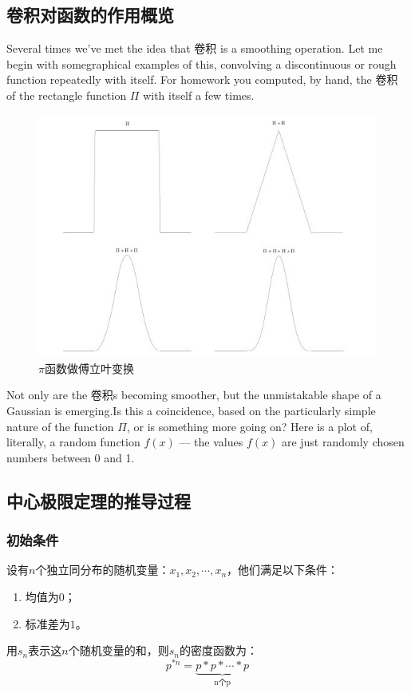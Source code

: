 \subsection{卷积对函数的作用概览}
Several times we've met the idea that 卷积 is a smoothing
operation. Let me begin with somegraphical examples of this,
convolving a discontinuous or rough function repeatedly with itself.
For homework you computed, by hand, the 卷积 of the rectangle
function $\Pi$ with itself a few times.
\begin{figure}[H]
	\centering
	\includegraphics[scale=0.4]{assets/PI.jpg}
	\caption{$\pi$函数做傅立叶变换}
\end{figure}
Not only are the 卷积s becoming smoother, but the
unmistakable shape of a Gaussian is emerging.Is this a coincidence,
based on the particularly simple nature of the function $\Pi$, or
is something more going on? Here is a plot of, literally, a random
function $f(x)$ --- the values $f(x)$ are just randomly chosen
numbers between 0 and 1.

\subsection{中心极限定理的推导过程}
\subsubsection{初始条件}
设有$n$个独立同分布的随机变量：$x_1,x_2,\cdots,x_n$，他们满足以下条件：
\begin{enumerate}
	\def\labelenumi{\arabic{enumi}.}
	\item
	      均值为$0$；
	\item
	      标准差为$1$。
\end{enumerate}
用$s_n$表示这$n$个随机变量的和，则$s_n$的密度函数为：
$$
	p^{*n}=\underbrace{p*p*\cdots *p}_{\text{n个p}}
$$

